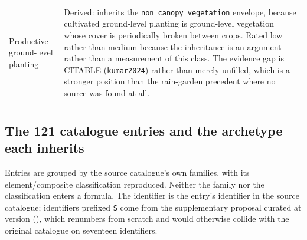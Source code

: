 \begin{longtable}{@{}>{\raggedright\arraybackslash}p{30mm}
                    >{\raggedright\arraybackslash}p{95mm}@{}}
\addlinespace
Productive ground-level planting &
Derived: inherits the \texttt{non\_canopy\_vegetation} envelope, because cultivated ground-level planting is ground-level vegetation whose cover is periodically broken between crops. Rated low rather than medium because the inheritance is an argument rather than a measurement of this class. The evidence gap is CITABLE (\texttt{kumar2024}) rather than merely unfilled, which is a stronger position than the rain-garden precedent where no source was found at all. \\
\addlinespace
\end{longtable}

\subsection{The \texorpdfstring{\num{121}}{121} catalogue entries and the
archetype each inherits}

Entries are grouped by the source catalogue's own families, with its
element/composite classification reproduced. Neither the family nor the
classification enters a formula. The identifier is the entry's identifier in
the source catalogue; identifiers prefixed \texttt{S} come from the
supplementary proposal curated at version \methver{}
(), which renumbers from scratch and would otherwise
collide with the original catalogue on seventeen identifiers.


